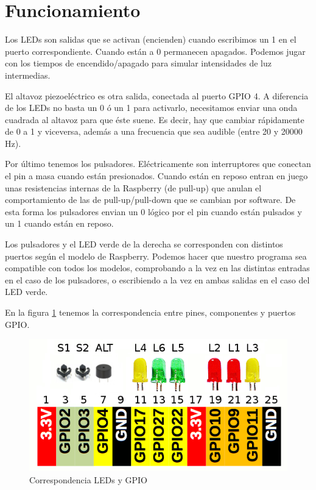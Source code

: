 \newpage

\section{Funcionamiento}

Los LEDs son salidas que se activan (encienden) cuando escribimos un 1
en el puerto correspondiente. Cuando están a 0 permanecen apagados. Podemos
jugar con los tiempos de encendido/apagado para simular intensidades de luz
intermedias.

El altavoz piezoeléctrico es otra salida, conectada al puerto GPIO 4. A diferencia
de los LEDs no basta un 0 ó un 1 para activarlo, necesitamos enviar una onda
cuadrada al altavoz para que éste suene. Es decir, hay que cambiar rápidamente de
0 a 1 y viceversa, además a una frecuencia que sea audible (entre 20 y 20000 Hz).

Por último tenemos los pulsadores. Eléctricamente son interruptores que conectan
el pin a masa cuando están presionados. Cuando están en reposo entran en juego
unas resistencias internas de la Raspberry (de pull-up) que anulan el comportamiento de
las de pull-up/pull-down que se cambian por software. De esta forma los pulsadores
envian un 0 lógico por el pin cuando están pulsados y un 1 cuando están en reposo.

Los pulsadores y el LED verde de la derecha se corresponden con
distintos puertos según el modelo de Raspberry. Podemos hacer que nuestro
programa sea compatible con todos los modelos, comprobando a la vez en las distintas
entradas en el caso de los pulsadores, o escribiendo a la vez en ambas salidas
en el caso del LED verde.

En la figura \ref{fig:pinout2} tenemos la correspondencia entre pines, componentes
y puertos GPIO.

\begin{figure}[h]
  \centering
    \includegraphics[width=14cm]{graphs/RaspberryGPIOaux.png}
  \caption{Correspondencia LEDs y GPIO}
  \label{fig:pinout2}
\end{figure}

